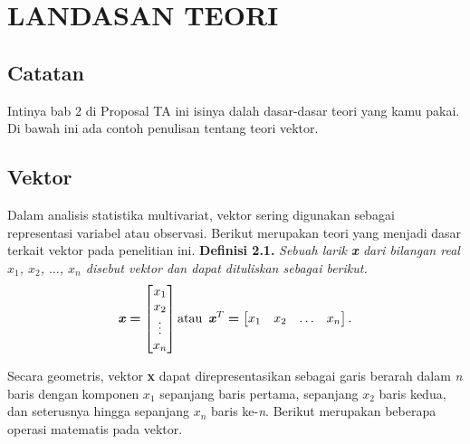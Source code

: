 \chapter{LANDASAN TEORI}

\section{Catatan}
Intinya bab 2 di Proposal TA ini isinya dalah dasar-dasar teori yang kamu pakai. Di bawah ini ada contoh penulisan tentang teori vektor.

\section{Vektor}
Dalam analisis statistika multivariat, vektor sering digunakan sebagai representasi variabel atau observasi. Berikut merupakan teori yang menjadi dasar terkait vektor pada penelitian ini.
\newline \textbf{Definisi 2.1.} \citep{johnsonwichern} \textit{Sebuah larik \textbf{x} dari bilangan real $x_1$, $x_2$, $\ldots$, $x_n$ disebut vektor dan dapat dituliskan sebagai berikut.}
$$
\text{\textit{\textbf{x}}} \bm{=}
\begin{bmatrix}
x_1 \\x_2 \\ \vdots \\x_n
\end{bmatrix}
\text{atau \,}
\text{\textit{\textbf{x}}}^T 
\bm{=} 
\begin{bmatrix}
x_1 & x_2 & \ldots & x_n
\end{bmatrix}\text{.}
$$ 
\par Secara geometris, vektor \textbf{x} dapat direpresentasikan sebagai garis berarah dalam \textit{n} baris dengan komponen $x_1$ sepanjang baris pertama, sepanjang $x_2$ baris kedua, dan seterusnya hingga sepanjang $x_n$ baris ke-\textit{n}. Berikut merupakan beberapa operasi matematis pada vektor.
